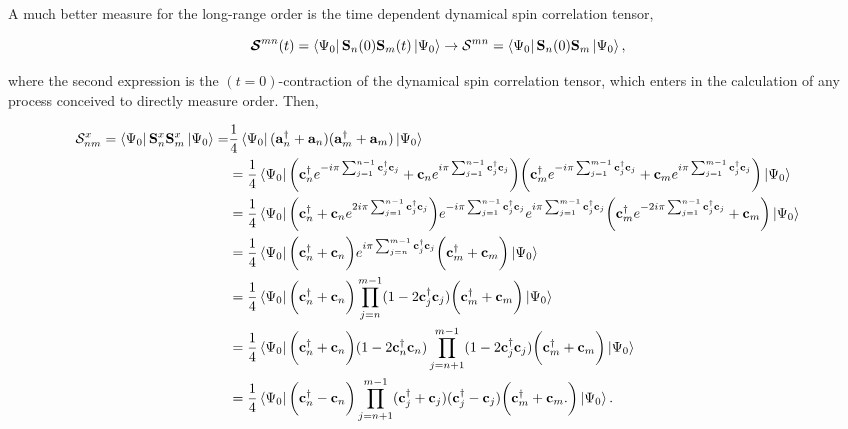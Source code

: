 \documentclass{homework}
\begin{document}
A much better measure for the long-range order is the time dependent dynamical spin correlation tensor, 

\begin{equation}
    \bm{\mathcal{S}}^{mn}(t) = \bra{\Psi_0} \spin_{n}(0) \spin_{m}(t) \ket{\Psi_0} \rightarrow \mathcal{S}^{mn} = \bra{\Psi_0} \spin_{n}(0) \spin_{m} \ket{\Psi_0},
\end{equation}

where the second expression is the $(t=0)$-contraction of the dynamical spin correlation tensor, which enters in the calculation of any process conceived to directly measure order. Then, 

\begin{equation}
    \begin{split}
        \mathcal{S}_{nm}^x = \bra{\Psi_0} \spin_n^x \spin_m^x \ket{\Psi_0} =& \frac{1}{4} \bra{\Psi_0} ({\bf a}_n^\dagger + {\bf a}_n)({\bf a}_m^\dagger + {\bf a}_m) \ket{\Psi_0}\\
            &= \frac{1}{4} \bra{\Psi_0} \bigg({\bf c}_n^\dagger e^{-i\pi \sum_{j = 1}^{n-1} {\bf c}_j^\dagger {\bf c}_j} + {\bf c}_n e^{i\pi \sum_{j = 1}^{n-1} {\bf c}_j^\dagger {\bf c}_j}\bigg) \bigg({\bf c}_m^\dagger e^{-i\pi \sum_{j = 1}^{m-1} {\bf c}_j^\dagger {\bf c}_j} + {\bf c}_m e^{i\pi \sum_{j = 1}^{m-1} {\bf c}_j^\dagger {\bf c}_j} \bigg)\ket{\Psi_0} \\
            &= \frac{1}{4} \bra{\Psi_0} \bigg({\bf c}_n^\dagger + {\bf c}_n e^{2i\pi \sum_{j = 1}^{n-1} {\bf c}_j^\dagger {\bf c}_j} \bigg) e^{-i\pi \sum_{j = 1}^{n-1} {\bf c}_j^\dagger {\bf c}_j} e^{i\pi \sum_{j = 1}^{m-1} {\bf c}_j^\dagger {\bf c}_j} \bigg({\bf c}_m^\dagger e^{-2i\pi \sum_{j = 1}^{n-1} {\bf c}_j^\dagger {\bf c}_j} + {\bf c}_m \bigg)\ket{\Psi_0}\\
            &= \frac{1}{4} \bra{\Psi_0} \bigg({\bf c}_n^\dagger + {\bf c}_n\bigg) e^{i\pi \sum_{j = n}^{m-1} {\bf c}_j^\dagger {\bf c}_j} \bigg({\bf c}_m^\dagger + {\bf c}_m \bigg)\ket{\Psi_0}\\
            &= \frac{1}{4} \bra{\Psi_0} \bigg({\bf c}_n^\dagger + {\bf c}_n\bigg) \prod_{j=n}^{m-1} ({1-2{\bf c}_j^\dagger {\bf c}_j}) \bigg({\bf c}_m^\dagger + {\bf c}_m \bigg)\ket{\Psi_0} \\
            &= \frac{1}{4} \bra{\Psi_0} \bigg({\bf c}_n^\dagger + {\bf c}_n\bigg) ({1-2{\bf c}_n^\dagger {\bf c}_n}) \prod_{j=n+1}^{m-1} ({1-2{\bf c}_j^\dagger {\bf c}_j}) \bigg({\bf c}_m^\dagger + {\bf c}_m \bigg)\ket{\Psi_0} \\
            &= \frac{1}{4} \bra{\Psi_0} \bigg({\bf c}_n^\dagger - {\bf c}_n\bigg) \prod_{j=n+1}^{m-1} ({\bf c}_j^\dagger + {\bf c}_j)({\bf c}_j^\dagger - {\bf c}_j) \bigg({\bf c}_m^\dagger + {\bf c}_m. \bigg)\ket{\Psi_0}.
    \end{split}
\end{equation}
\end{document}
